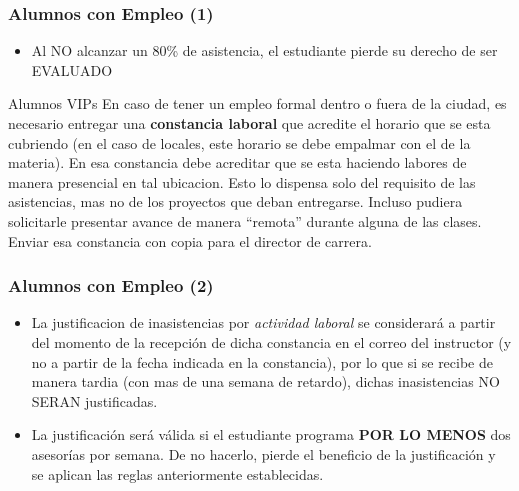 \begin{frame}
\frametitle{Alumnos con Empleo (1)}
\begin{itemize}
\item Al NO alcanzar un 80\% de asistencia, el estudiante pierde su derecho de ser EVALUADO
\end{itemize}
\begin{block}{Alumnos VIPs}
En caso de tener un empleo formal dentro o fuera de la ciudad, es necesario entregar una \textbf{constancia laboral} que acredite el horario que se esta cubriendo (en el caso de locales, este horario se debe empalmar con el de la materia). En esa constancia debe acreditar que se esta haciendo labores de manera presencial en tal ubicacion. Esto lo dispensa solo del requisito de las asistencias, mas no de los proyectos que deban entregarse. Incluso pudiera solicitarle presentar avance de manera ``remota'' durante alguna de las clases. Enviar esa constancia con copia para el director de carrera.
\end{block}
\end{frame}


\begin{frame}
\frametitle{Alumnos con Empleo (2)}
\begin{itemize}
\item La justificacion de inasistencias por \textit{actividad laboral} se considerar\'a a partir del momento de la recepci\'on de dicha constancia en el correo del instructor (y no a partir de la fecha indicada en la constancia), por lo que si se recibe de manera tardia (con mas de una semana de retardo), dichas inasistencias NO SERAN justificadas.
\item La justificación será válida si el estudiante programa \textbf{POR LO MENOS} dos asesorías por semana. De no hacerlo, pierde el beneficio de la justificación y se aplican las reglas anteriormente establecidas. 
\end{itemize}

\end{frame}






